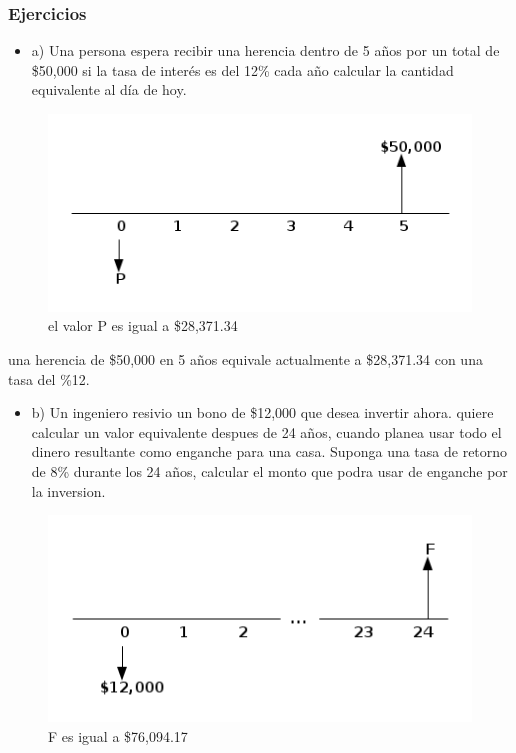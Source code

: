 \documentclass[11pt]{article}
\begin{document}
\subsubsection*{Ejercicios}
\label{sec:orgc4f11aa}
\begin{itemize}
\item a) Una persona espera recibir una herencia dentro de 5 años por un total de \$50,000 si la tasa de interés es del 12\% cada año calcular la cantidad equivalente al día de hoy.
\end{itemize}

\begin{figure}[htbp]
\centering
\includegraphics[width=.9\linewidth]{img/ejerccio1.png}
\caption{el valor P es igual a \$28,371.34}
\end{figure}

una herencia de \$50,000 en 5 años equivale actualmente a \$28,371.34 con una tasa del \%12.

\begin{itemize}
\item b) Un ingeniero resivio un bono de \$12,000 que desea invertir ahora. quiere calcular un valor equivalente despues de 24 años, cuando planea usar todo el dinero resultante como enganche para una casa. Suponga una tasa de retorno de 8\% durante los 24 años, calcular el monto que podra usar de enganche por la inversion.
\end{itemize}

\begin{figure}[htbp]
\centering
\includegraphics[width=.9\linewidth]{wdqweewq.png}
\caption{F es igual a \$76,094.17}
\end{figure}
\end{document}

